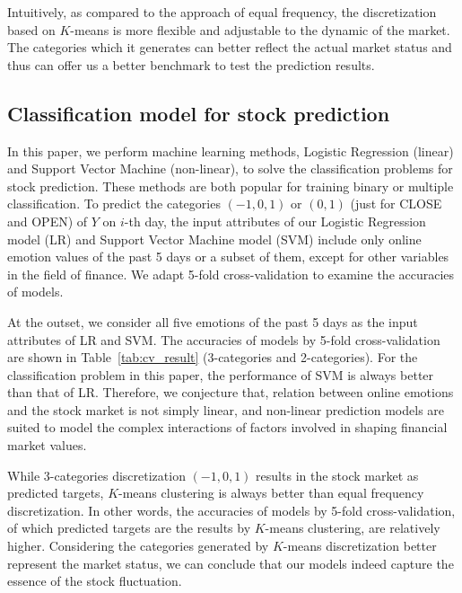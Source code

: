 \documentclass[aps,preprint,groupedaddress]{revtex4-1}
\begin{document}
Intuitively, as compared to the approach of equal frequency, the discretization based on $K$-means is more flexible and adjustable to the dynamic of the market. The categories which it generates can better reflect the actual market status {\color{black}{(it is hard to say that the market will rise, drop or keep stable with the same probability)}} and thus can offer us a better benchmark to test the prediction results. 

\subsection{Classification model for stock prediction}
In this paper, we perform machine learning methods, Logistic Regression (linear) and Support Vector Machine (non-linear), to solve the classification problems for stock prediction. These methods are both popular for training binary or multiple classification. To predict the categories $(-1, 0, 1)$ or $(0, 1)$ (just for CLOSE and OPEN) of $Y$ on $i$-th day, the input attributes of our Logistic Regression model (LR) and Support Vector Machine model (SVM) include only online emotion values of the past 5 days or a subset of them, except for other variables in the field of finance. We adapt 5-fold cross-validation to examine the accuracies of models.

At the outset, we consider all five emotions of the past 5 days as the input attributes of LR and SVM. The accuracies of models by 5-fold cross-validation are shown in Table~\ref{tab:cv_result} (3-categories and 2-categories). For the classification problem in this paper, the performance of SVM is always better than that of LR. Therefore, we conjecture that, relation between online emotions and the stock market is not simply linear, and non-linear prediction models are suited to model the complex interactions of factors involved in shaping financial market values.

While 3-categories discretization $(-1, 0, 1)$ results in the stock market as predicted targets, $K$-means clustering is always better than equal frequency discretization. In other words, the accuracies of models by 5-fold cross-validation, of which predicted targets are the results by $K$-means clustering, are relatively higher. Considering the categories generated by $K$-means discretization better represent the market status, we can conclude that our models indeed capture the essence of the stock fluctuation. {\color{black}{Note that for other $K$ values like 5 or 7, it is hard to establish competent prediction models because of the sparsity and hence the results are not reported. In fact, in realistic applications, it is sufficient for investors to derive decisions from the prediction model of $K=3$.}}
\end{document}
